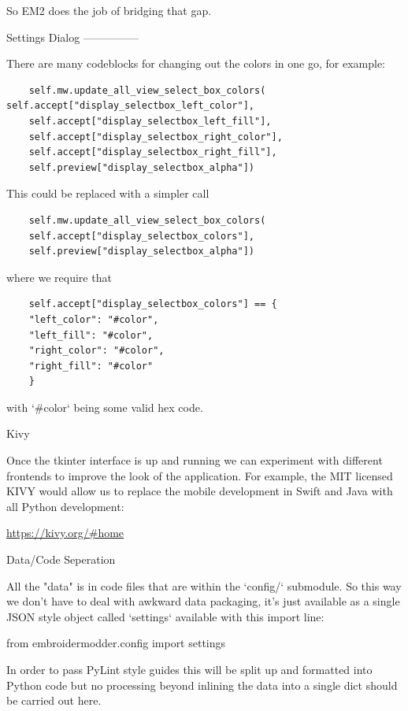 \documentclass[a4paper]{report}
\begin{document}
So EM2 does the job of bridging that gap.

Settings Dialog
---------------

There are many codeblocks for changing out the colors in one go, for example:

\begin{lstlisting}
    self.mw.update_all_view_select_box_colors(    self.accept["display_selectbox_left_color"],
    self.accept["display_selectbox_left_fill"],
    self.accept["display_selectbox_right_color"],
    self.accept["display_selectbox_right_fill"],
    self.preview["display_selectbox_alpha"])
\end{lstlisting}

This could be replaced with a simpler call

\begin{lstlisting}
    self.mw.update_all_view_select_box_colors(
    self.accept["display_selectbox_colors"],
    self.preview["display_selectbox_alpha"])
\end{lstlisting}

where we require that

\begin{lstlisting}
    self.accept["display_selectbox_colors"] == {
    "left_color": "#color",
    "left_fill": "#color",
    "right_color": "#color",
    "right_fill": "#color"
    }
\end{lstlisting}

with `\#color` being some valid hex code.

Kivy
~~~~

Once the tkinter interface is up and running we can experiment
with different frontends to improve the look of the application.
For example, the MIT licensed KIVY would allow us to replace the 
mobile development in Swift and Java with all Python development:

\url{https://kivy.org/#home}

Data/Code Seperation
~~~~~~~~~~~~~~~~~~~~

All the "data" is in code files that are within the `config/`
submodule. So this way we don't have to deal with awkward data
packaging, it's just available as a single JSON style object
called `settings` available with this import line:

    from embroidermodder.config import settings

In order to pass PyLint style guides this will be split up and
formatted into Python code but no processing beyond inlining
the data into a single dict should be carried out here.
\end{document}

